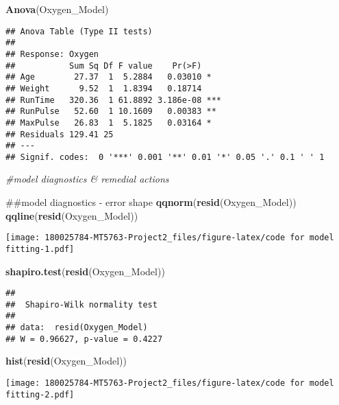 \documentclass[]{article}
\newenvironment{Shaded}{\begin{snugshade}}{\end{snugshade}}
\newcommand{\KeywordTok}[1]{\textcolor[rgb]{0.13,0.29,0.53}{\textbf{#1}}}
\newcommand{\CommentTok}[1]{\textcolor[rgb]{0.56,0.35,0.01}{\textit{#1}}}
\newcommand{\NormalTok}[1]{#1}
\begin{document}
\begin{Shaded}
\begin{Highlighting}[]
\KeywordTok{Anova}\NormalTok{(Oxygen_Model)}
\end{Highlighting}
\end{Shaded}

\begin{verbatim}
## Anova Table (Type II tests)
## 
## Response: Oxygen
##           Sum Sq Df F value    Pr(>F)    
## Age        27.37  1  5.2884   0.03010 *  
## Weight      9.52  1  1.8394   0.18714    
## RunTime   320.36  1 61.8892 3.186e-08 ***
## RunPulse   52.60  1 10.1609   0.00383 ** 
## MaxPulse   26.83  1  5.1825   0.03164 *  
## Residuals 129.41 25                      
## ---
## Signif. codes:  0 '***' 0.001 '**' 0.01 '*' 0.05 '.' 0.1 ' ' 1
\end{verbatim}

\begin{Shaded}
\begin{Highlighting}[]
\CommentTok{#model diagnostics & remedial actions}

\NormalTok{##model diagnostics - error shape}
\KeywordTok{qqnorm}\NormalTok{(}\KeywordTok{resid}\NormalTok{(Oxygen_Model))}
\KeywordTok{qqline}\NormalTok{(}\KeywordTok{resid}\NormalTok{(Oxygen_Model))}
\end{Highlighting}
\end{Shaded}

\texttt{[image: 180025784-MT5763-Project2\_files/figure-latex/code for model fitting-1.pdf]}

\begin{Shaded}
\begin{Highlighting}[]
\KeywordTok{shapiro.test}\NormalTok{(}\KeywordTok{resid}\NormalTok{(Oxygen_Model))}
\end{Highlighting}
\end{Shaded}

\begin{verbatim}
## 
##  Shapiro-Wilk normality test
## 
## data:  resid(Oxygen_Model)
## W = 0.96627, p-value = 0.4227
\end{verbatim}

\begin{Shaded}
\begin{Highlighting}[]
\KeywordTok{hist}\NormalTok{(}\KeywordTok{resid}\NormalTok{(Oxygen_Model))}
\end{Highlighting}
\end{Shaded}

\texttt{[image: 180025784-MT5763-Project2\_files/figure-latex/code for model fitting-2.pdf]}
\end{document}
